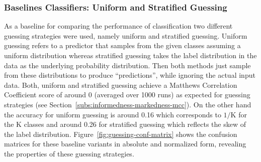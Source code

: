 \subsubsection{Baselines Classifiers: Uniform and Stratified Guessing}
\label{subs:baselines-classifiers}

As a baseline for comparing the performance of classification two different guessing strategies were used, namely uniform and stratified guessing.
Uniform guessing refers to a predictor that samples from the given classes assuming a uniform distribution whereas stratified guessing takes the label distribution in the data as the underlying probability distribution.
Then both methods just sample from these distributions to produce ``predictions'', while ignoring the actual input data. Both, uniform and stratified guessing achieve a Matthews Correlation Coefficient score of around 0 (averaged over 1000 runs) as expected for guessing strategies (see Section~\ref{subs:informedness-markedness-mcc}). On the other hand the accuracy for uniform guessing is around 0.16 which corresponds to $1/\text{K}$ for the K classes and around 0.26 for stratified guessing which reflects the skew of the label distribution.
Figure~\ref{fig:guessing-conf-matrix} shows the confusion matrices for these baseline variants in absolute and normalized form, revealing the properties of these guessing strategies.

